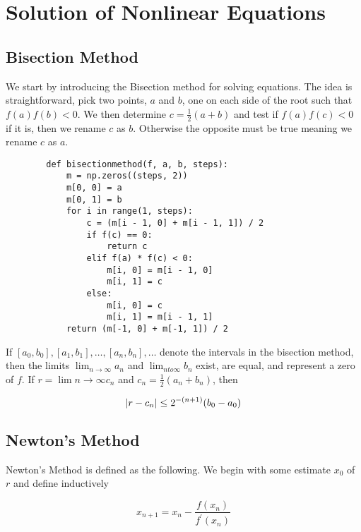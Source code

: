 \section{Solution of Nonlinear Equations}

        \subsection{Bisection Method}
        We start by introducing the Bisection method for solving equations. The idea is straightforward, pick two points,
        $a$ and $b$, one on each side of the root such that $f(a)f(b) < 0$. We then determine $c = \frac{1}{2}(a + b)$ and
        test if $f(a)f(c) <0$ if it is, then we rename $c$ as $b$. Otherwise the opposite must be true meaning we rename $c$
        as $a$.

        \begin{lstlisting}
        def bisectionmethod(f, a, b, steps):
            m = np.zeros((steps, 2))
            m[0, 0] = a
            m[0, 1] = b
            for i in range(1, steps):
                c = (m[i - 1, 0] + m[i - 1, 1]) / 2
                if f(c) == 0:
                    return c
                elif f(a) * f(c) < 0:
                    m[i, 0] = m[i - 1, 0]
                    m[i, 1] = c
                else:
                    m[i, 0] = c
                    m[i, 1] = m[i - 1, 1]
            return (m[-1, 0] + m[-1, 1]) / 2
        \end{lstlisting}

        \begin{thm}
            If $[a_0, b_0], [a_1, b_1], \ldots, [a_n, b_n], \ldots$ denote the intervals in the bisection method, then the
            limits $\lim_{n\to\infty}a_n$ and $\lim_{nto\infty}b_n$ exist, are equal, and represent a zero of $f$. If
            $r=\lim{n\to\infty}c_n$ and $c_n = \frac{1}{2} (a_n + b_n)$, then

            \[
                \left\lvert r - c_n \right\rvert \le 2^{-(n + 1)}(b_0 - a_0)
            \]
        \end{thm}


    \subsection{Newton's Method}
        Newton's Method is defined as the following. We begin with some estimate $x_0$ of $r$ and define inductively

        \[ x_{n + 1} = x_n - \frac{f(x_n)}{f^\prime(x_n)} \]

